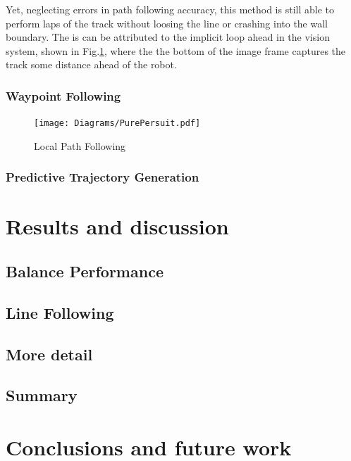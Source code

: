             Yet, neglecting errors in path following accuracy, this method is still able to perform laps of the track 
            without loosing the line or crashing into the wall boundary. The is can be attributed to 
            the implicit loop ahead in the vision system, shown in Fig.\ref{fig:PurePersuit}, where the the bottom of the image frame 
            captures the track some distance ahead of the robot.
            
            \subsubsection{Waypoint Following}

            \begin{figure}[h]
                \centering
                \texttt{[image: Diagrams/PurePersuit.pdf]}
                \caption{Local Path Following}
                \label{fig:PurePersuit}
            \end{figure}

            \subsubsection{Predictive Trajectory Generation}
    
    \pagebreak{}


  \section{Results and discussion} %
    \subsection{Balance Performance}
    \subsection{Line Following}
   

    \subsection{More detail}
    \subsection{Summary}
  \section{Conclusions and future work} %
